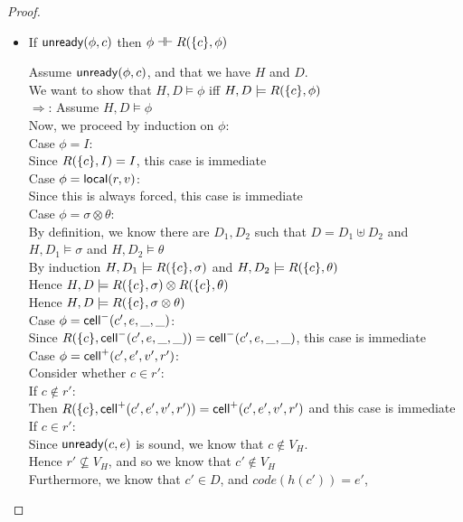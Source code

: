 \begin{proof}
\begin{itemize}
\item If $\mathsf{unready}({\phi}, {c})$ then $\phi \dashv\vdash R(\{{c}\}, \phi)$
\begin{tabbedproof}
\oo Assume $\mathsf{unready}({\phi}, {c})$, and that we have $H$ and $D$. \\
\oo We want to show that $H, D \models \phi$ iff $H, D \models R(\{{c}\}, \phi)$ \\
\oo $\Rightarrow$: Assume $H, D \models \phi$ \\
\ooo Now, we proceed by induction on $\phi$: \\
\ooo Case $\phi = I$: \\
\oooo Since $R(\{{c}\}, I) = I$, this case is immediate \\
\ooo Case $\phi = \mathsf{local}({r}, {v})$: \\
\oooo Since this is always forced, this case is immediate \\
\ooo Case $\phi = \sigma \otimes \theta$: \\
\oooo By definition, we know there are $D_1, D_2$ such that $D = D_1 \uplus D_2$ and \\
\ooox $H, D_1 \models \sigma$ and $H, D_2 \models \theta$ \\
\oooo By induction $H, D_1 \models R(\{{c}\}, \sigma)$ and $H, D_2 \models R(\{{c}\}, \theta)$ \\
\oooo Hence $H, D \models R(\{{c}\}, \sigma) \otimes R(\{{c}\}, \theta)$ \\
\oooo Hence $H, D \models R(\{{c}\}, \sigma \otimes \theta)$ \\
\ooo Case $\phi = \mathsf{cell}^{-}({c'}, {e}, {\_}, {\_})$: \\
\oooo Since $R(\{{c}\}, \mathsf{cell}^{-}({c'}, {e}, {\_}, {\_})) = \mathsf{cell}^{-}({c'}, {e}, {\_}, {\_})$, this case is immediate \\
\ooo Case $\phi = \mathsf{cell}^{+}({c'}, {e'}, {v'}, {r'})$: \\
\oooo Consider whether $c \in r'$: \\
\oooo If $c \not\in r'$: \\
\ooooo Then $R(\{{c}\}, \mathsf{cell}^{+}({c'}, {e'}, {v'}, {r'})) = \mathsf{cell}^{+}({c'}, {e'}, {v'}, {r'})$ and this case is immediate \\
\oooo If $c \in r'$: \\
\ooooo Since $\mathsf{unready}({c}, {e})$ is sound, we know that $c \not\in V_H$. \\ 
\ooooo Hence $r' \not\subseteq V_H$, and so we know that $c' \not\in V_H$ \\
\ooooo Furthermore, we know that $c' \in D$, and $\mathit{code}(h(c')) = e'$, \\

\end{tabbedproof}
\end{itemize}
\end{proof}
